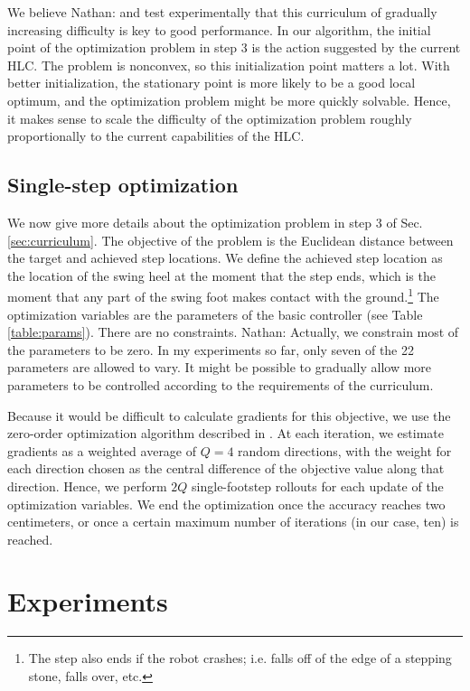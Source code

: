 \documentclass[a4paper]{article}
\newcommand{\nhatch}[1]{{\leavevmode\color{blue} Nathan: #1}}
\begin{document}
We believe \nhatch{and test experimentally} that this curriculum of gradually increasing difficulty is key to good performance.
In our algorithm, the initial point of the optimization problem in step 3 is the action suggested by the current HLC.
The problem is nonconvex, so this initialization point matters a lot.
With better initialization, the stationary point is more likely to be a good local optimum, and the optimization problem might be more quickly solvable.
Hence, it makes sense to scale the difficulty of the optimization problem roughly proportionally to the current capabilities of the HLC.

\subsection{Single-step optimization} \label{sec:optimization}

We now give more details about the optimization problem in step 3 of Sec. \ref{sec:curriculum}.
The objective of the problem is the Euclidean distance between the target and achieved step locations.
We define the achieved step location as the location of the swing heel at the moment that the step ends, which is the moment that any part of the swing foot makes contact with the ground.\footnote{The step also ends if the robot crashes; i.e. falls off of the edge of a stepping stone, falls over, etc.}
The optimization variables are the parameters of the basic controller (see Table \ref{table:params}).
There are no constraints.
\nhatch{Actually, we constrain most of the parameters to be zero. In my experiments so far, only seven of the 22 parameters are allowed to vary. It might be possible to gradually allow more parameters to be controlled according to the requirements of the curriculum.}

Because it would be difficult to calculate gradients for this objective, we use the zero-order optimization algorithm described in \cite{mania2018simple}.
At each iteration, we estimate gradients as a weighted average of $Q = 4$ random directions, with the weight for each direction chosen as the central difference of the objective value along that direction.
Hence, we perform $2Q$ single-footstep rollouts for each update of the optimization variables.
We end the optimization once the accuracy reaches two centimeters, or once a certain maximum number of iterations (in our case, ten) is reached.

\section{Experiments}
\end{document}

